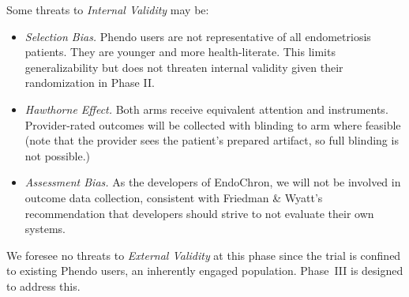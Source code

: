 Some threats to \textit{Internal Validity} may be:

\begin{itemize}
  \item \textit{Selection Bias.} Phendo users are not representative of all endometriosis patients. They are younger and more health-literate\cite{Urteaga2022Engagement}. This limits generalizability but does not threaten internal validity given their randomization in Phase II.
  \item \textit{Hawthorne Effect.} Both arms receive equivalent attention and instruments. Provider-rated outcomes will be collected with blinding to arm where feasible (note that the provider sees the patient's prepared artifact, so full blinding is not possible.)
  \item \textit{Assessment Bias.} As the developers of EndoChron, we will not be involved in outcome data collection, consistent with Friedman \& Wyatt's recommendation that developers should strive to not evaluate their own systems\cite{Friedman2006EvaluationMethods}.
\end{itemize}

We foresee no threats to \textit{External Validity} at this phase since the trial is confined to existing Phendo users, an inherently engaged population. Phase~III is designed to address this.
